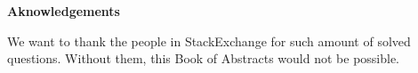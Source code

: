 
{\LARGE \textbf{Aknowledgements}}
\vspace{0.5cm}
\par\noindent
We want to thank the people in StackExchange for such amount of solved questions. Without them, this Book of Abstracts would not be possible.
